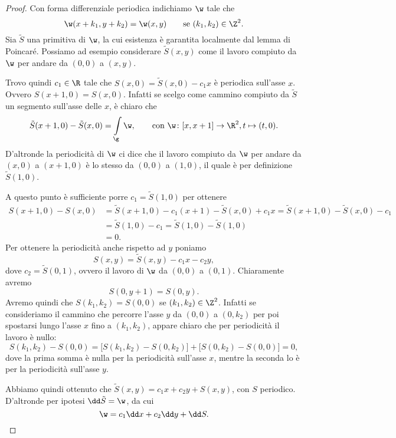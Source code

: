 \begin{proof}
	Con forma differenziale periodica indichiamo \(\w\) tale che
	\[
		\w(x+k_1,y+k_2) = \w(x,y) \qquad\text{se }(k_1,k_2)\in \Z^2.
	\]
	Sia \(\tilde{S}\) una primitiva di \(\w\), la cui esistenza è garantita localmente dal lemma di Poincaré.
	Possiamo ad esempio considerare \(\tilde{S}(x,y)\) come il lavoro compiuto da \(\w\) per andare da \((0,0)\) a \((x,y)\).

	Trovo quindi \(c_1\in \R\) tale che \(S(x,0) = \tilde{S}(x,0) - c_1 x\) è periodica sull'asse \(x\).
	Ovvero \(S(x+1,0) = S(x,0)\).
	Infatti se scelgo come cammino compiuto da \(\tilde{S}\) un segmento sull'asse delle \(x\), è chiaro che
	\[
		\tilde{S}(x+1,0) - \tilde{S}(x,0) = \int\limits_\g \w, \qquad\text{con }\w\colon [x,x+1] \to \R^2, t \mapsto (t,0).
	\]
	D'altronde la periodicità di \(\w\) ci dice che il lavoro compiuto da \(\w\) per andare da \((x,0)\) a \((x+1,0)\) è lo stesso da \((0,0)\) a \((1,0)\), il quale è per definizione \(\tilde{S}(1,0)\).

	A questo punto è sufficiente porre \(c_1 = \tilde{S}(1,0)\) per ottenere
	\[
		\begin{split}
			S(x+1,0) - S(x,0) & = \tilde{S}(x+1,0) - c_1 (x+1) - \tilde{S}(x,0) + c_1 x = \tilde{S}(x+1,0)-\tilde{S}(x,0) - c_1\\
			& = \tilde{S}(1,0) - c_1 = \tilde{S}(1,0) - \tilde{S}(1,0)\\
			& = 0.
		\end{split}
	\]
	Per ottenere la periodicità anche rispetto ad \(y\) poniamo
	\[
		S(x,y) = \tilde{S}(x,y) - c_1 x - c_2 y,
	\]
	dove \(c_2 = \tilde{S}(0,1)\), ovvero il lavoro di \(\w\) da \((0,0)\) a \((0,1)\).
	Chiaramente avremo
	\[
		S(0,y+1)= S(0,y).
	\]
	Avremo quindi che \(S(k_1,k_2)=S(0,0)\) se \((k_1,k_2)\in\Z^2\).
	Infatti se consideriamo il cammino che percorre l'asse \(y\) da \((0,0)\) a \((0,k_2)\) per poi spostarsi lungo l'asse \(x\) fino a \((k_1,k_2)\), appare chiaro che per periodicità il lavoro è nullo:
	\[
		S(k_1,k_2) - S(0,0) = \big[S(k_1,k_2)-S(0,k_2)\big] + \big[S(0,k_2)-S(0,0)\big] = 0,
	\]
	dove la prima somma è nulla per la periodicità sull'asse \(x\), mentre la seconda lo è per la periodicità sull'asse \(y\).

	Abbiamo quindi ottenuto che \(\tilde{S}(x,y) = c_1 x + c_2 y + S(x,y)\), con \(S\) periodico.
	D'altronde per ipotesi \(\dd \tilde{S}=\w\), da cui
	\[
		\w = c_1 \dd x + c_2 \dd y + \dd S.
	\]
\end{proof}

